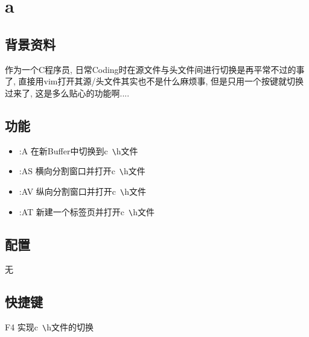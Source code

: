 \chapter{a}

\section{背景资料}
作为一个C程序员, 日常Coding时在源文件与头文件间进行切换是再平常不过的事了, 直接用vim打开其源/头文件其实也不是什么麻烦事, 但是只用一个按键就切换过来了, 这是多么贴心的功能啊....

\section{功能}
\begin{itemize}
    \item :A	在新Buffer中切换到c~\verb|\|h文件
    \item :AS	横向分割窗口并打开c~\verb|\|h文件
    \item :AV	纵向分割窗口并打开c~\verb|\|h文件
    \item :AT	新建一个标签页并打开c~\verb|\|h文件
\end{itemize}

\section{配置}
无

\section{快捷键}
F4 实现c~\verb|\|h文件的切换

\newpage
